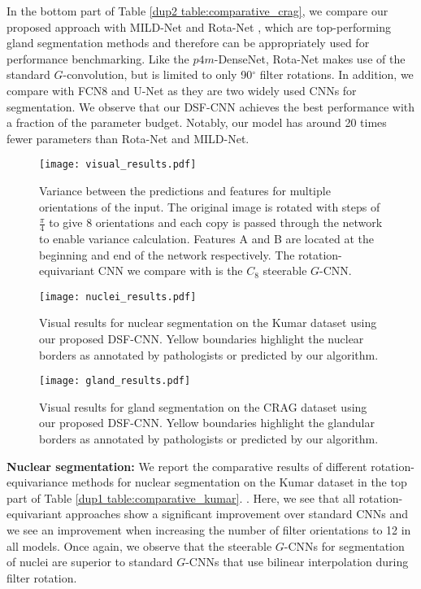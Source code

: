 \documentclass[journal]{IEEEtran}
\newcommand\mg[1]{{\color{black}{#1}}}
\begin{document}
	    In the bottom part of Table \ref{dup2 table:comparative_crag}, we compare our proposed approach with MILD-Net \cite{graham2019mild} and Rota-Net \cite{graham2019rota}, which are top-performing gland segmentation methods and therefore can be appropriately used for performance benchmarking. Like the $p4m$-DenseNet, Rota-Net makes use of the standard $G$-convolution, but is limited to only 90$^{\circ}$ filter rotations. In addition, we compare with FCN8 and U-Net as they are two widely used CNNs for segmentation. We observe that our DSF-CNN achieves the best performance with a fraction of the parameter budget. Notably, our model has around 20 times fewer parameters than Rota-Net and MILD-Net.
	    
	    	    	    		\begin{figure*}[t]
		\centering
        \texttt{[image: visual\_results.pdf]}
		\caption{Variance between the predictions and features for multiple orientations of the input. The original image is rotated with steps of $\frac{\pi}{4}$ to give 8 orientations and each copy is passed through the network to enable variance calculation. Features A and B are located at the beginning and end of the network respectively. The rotation-equivariant CNN we compare with is the $C_8$ steerable $G$-CNN.}
		\label{dup1 fig:visual_results}
	\end{figure*}
	    
	    	    \begin{figure*}[t]
		\centering
        \texttt{[image: nuclei\_results.pdf]}
		\caption{Visual results for nuclear segmentation on the Kumar dataset \cite{kumar2017dataset} using our proposed DSF-CNN. Yellow boundaries highlight the nuclear borders as annotated by pathologists or predicted by our algorithm.}
		\label{fig:visual_results_nuclei}
	\end{figure*}
	

	  \begin{figure*}[t]
		\centering
        \texttt{[image: gland\_results.pdf]}
		\caption{Visual results for gland segmentation on the CRAG dataset \cite{graham2019mild} using our proposed DSF-CNN. Yellow boundaries highlight the glandular borders as annotated by pathologists or predicted by our algorithm.}
		\label{fig:visual_results_gland}
	\end{figure*}
	    
	
	    \textbf{Nuclear segmentation: }We report the comparative results of different rotation-equivariance methods for nuclear segmentation on the Kumar dataset in the top part of Table \ref{dup1 table:comparative_kumar}. \mg{Similar to above, we compare conventional CNNs with both standard and steerable $G$-CNNs}. Here, we see that all rotation-equivariant approaches show a significant improvement over standard CNNs and we see an improvement when increasing the number of filter orientations to 12 in all models. Once again, we observe that the steerable $G$-CNNs for segmentation of nuclei are superior to standard $G$-CNNs that use bilinear interpolation during filter rotation.
	    
\end{document}
